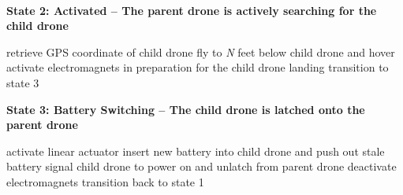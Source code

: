 \documentclass[paper=a4, fontsize=10pt]{scrartcl}
\begin{document}
\hfill\\%
\textbf{State 2: Activated -- The parent drone is actively searching for the child drone}\\%
\begin{algorithm}[H]
	retrieve GPS coordinate of child drone\;
	fly to \textit{N} feet below child drone and hover\;
    activate electromagnets in preparation for the child drone landing\;
	transition to state 3\;
\end{algorithm}
\newpage\noindent
\textbf{State 3: Battery Switching -- The child drone is latched onto the parent drone}\\%
\begin{algorithm}[H]
	activate linear actuator\;
	insert new battery into child drone and push out stale battery\;
	signal child drone to power on and unlatch from parent drone\;
	deactivate electromagnets\;
	transition back to state 1\;
\end{algorithm}
\end{document}

